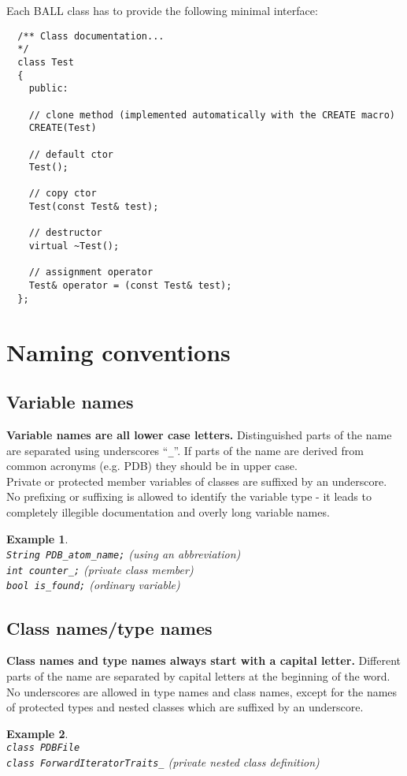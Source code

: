 \documentclass[a4paper,10pt]{article}
\newtheorem{example}{Example}
\begin{document}
Each BALL class has to provide the following minimal interface:
\begin{verbatim}
  /** Class documentation... 
  */
  class Test
  {
    public:

    // clone method (implemented automatically with the CREATE macro)
    CREATE(Test)    

    // default ctor
    Test();

    // copy ctor 
    Test(const Test& test);

    // destructor 
    virtual ~Test();
 
    // assignment operator
    Test& operator = (const Test& test);
  };
\end{verbatim}



\section{Naming conventions}


\subsection{Variable names}

{\bf Variable names are all lower case letters.} Distinguished parts of the name are
separated using underscores ``{\tt \_}''. If parts of the name are derived
from common acronyms (e.g. PDB) they should be in upper case.\\
Private or protected member variables of classes are suffixed by an
underscore.\\
No prefixing or suffixing is allowed to identify the variable type - it 
leads to completely illegible documentation and overly long variable names.\\
\begin{example}\hspace*{2mm}\\
{\tt String PDB\_atom\_name;} (using an abbreviation)\\
{\tt int counter\_;} (private class member)\\
{\tt bool is\_found;} (ordinary variable)
\end{example}

\subsection{Class names/type names}

{\bf Class names and type names always start with a capital letter.} Different parts
of the name are separated by capital letters at the beginning of the word. No
underscores are allowed in type names and class names, except for the names of
protected types and nested classes which are suffixed by an underscore.
\begin{example}\hspace*{2mm}\\
{\tt class PDBFile}\\
{\tt class ForwardIteratorTraits\_} (private nested class definition)\\
\end{example}
\end{document}
